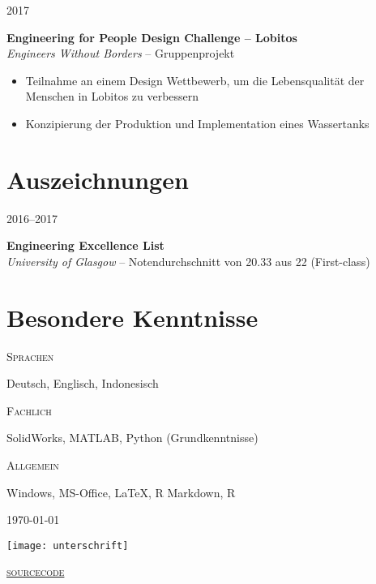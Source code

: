 \documentclass[a4paper]{article}
\newcommand{\entry}[4]{

	\begin{minipage}[t]{.20\textwidth}
		\hfill \textsc{#1}

	\end{minipage}
	\hfill\vline\hfill
	\begin{minipage}[t]{.75\textwidth}
		\textbf{#2}\\ 
		\textit{#3}    
		#4

	\end{minipage} 
	\vspace{.25cm}

}
\newcommand{\nentry}[2]{

	\begin{minipage}[t]{.20\textwidth}
		\hfill \textsc{#1}

	\end{minipage}
	\hfill\vline\hfill
	\begin{minipage}[t]{.75\textwidth}
		#2 

	\end{minipage}
	\vspace{.25cm} 

}
\begin{document}
\entry{2017}{Engineering for People Design Challenge -- Lobitos}{Engineers Without Borders}{-- Gruppenprojekt\vspace{-.25cm}
	\begin{itemize}[leftmargin=*]
		\setlength{\itemsep}{-3pt}
	\item Teilnahme an einem Design Wettbewerb, um die Lebensqualit{\"a}t der \newline\phantom{W}Menschen in Lobitos zu verbessern
	\item Konzipierung der Produktion und Implementation eines Wassertanks
	\end{itemize}
}

\section{Auszeichnungen}

\entry{2016--2017}{Engineering Excellence List}{University of Glasgow}{-- Notendurchschnitt von 20.33 aus 22 (First-class)}

\section{Besondere Kenntnisse}

\nentry{Sprachen}{Deutsch, Englisch, Indonesisch}

\nentry{Fachlich}{SolidWorks, MATLAB, Python \hfill (Grundkenntnisse)}

\nentry{Allgemein}{Windows, MS-Office, {\LaTeX}, R Markdown, R}

\vspace*{\fill} 
\begin{minipage}{0.4\textwidth}
	\today
\end{minipage}
\begin{minipage}{0.19\textwidth}
	\centering
	\hspace{-50mm}\texttt{[image: unterschrift]}
\end{minipage}
\begin{minipage}{0.4\textwidth}
	\flushright
	\href{https://github.com/emfiedler/cv/blob/master/CV.tex}{\textsc{sourcecode}}
\end{minipage}
\end{document}
